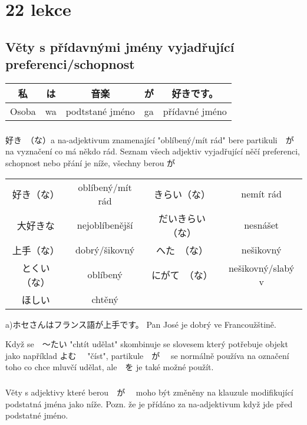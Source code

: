 \section{22 lekce}

\subsection{Věty s přídavnými jmény vyjadřující preferenci/schopnost}

\begin{tabular}{||c|c||c|c||c||}
\hline
私&は&音楽&が&好きです。\\
\hline
Osoba&wa&podtstané jméno&ga&přídavné jméno\\
\hline
\end{tabular}

\subsubsection{} 好き　（な）a na-adjektivum znamenající "oblíbený/mít rád" bere partikuli　が　 na vyznačení co má někdo rád. Seznam všech adjektiv vyjadřující něčí preferenci, schopnost nebo přání je níže, všechny berou が

\begin{tabular}{cccc}
好き（な）&oblíbený/mít rád&きらい（な）&nemít rád\\
大好きな&nejoblíbenější&だいきらい（な）&nesnášet\\
上手（な）&dobrý/šikovný&へた　（な）&nešikovný\\
とくい（な）&oblíbený&にがて　（な）&nešikovný/slabý v\\
ほしい&chtěný&&\\
\end{tabular}

a)ホセさんはフランス語が上手です。 Pan José je dobrý ve Francoužštině.

Když se　〜たい  "chtít udělat" skombinuje se slovesem který potřebuje objekt jako například よむ　 "číst", partikule　が　 se normálně používa na označení toho co chce mluvčí udělat, ale　を je také možné použít.


\subsubsection{} Věty s adjektivy které berou　が　 moho být změněny na klauzule modifikující podstatná jména jako níže. Pozn. že je přídáno za na-adjektivum když jde před podstatné jméno. 

